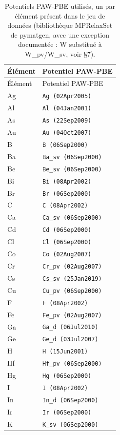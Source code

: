 \begin{longtable}{@{}l l@{}}
\caption{Potentiels PAW-PBE utilis\'es, un par \'el\'ement pr\'esent dans le jeu de donn\'ees (biblioth\`eque MPRelaxSet de pymatgen, avec une exception document\'ee : W substitu\'e \`a W\_pv/W\_sv, voir \S7).}\\
\toprule
\'El\'ement & Potentiel PAW-PBE \\
\midrule
\endfirsthead
\toprule
\'El\'ement & Potentiel PAW-PBE \\
\midrule
\endhead
\bottomrule
\endfoot
Ag & \texttt{Ag (02Apr2005)} \\
Al & \texttt{Al (04Jan2001)} \\
As & \texttt{As (22Sep2009)} \\
Au & \texttt{Au (04Oct2007)} \\
B & \texttt{B (06Sep2000)} \\
Ba & \texttt{Ba\_sv (06Sep2000)} \\
Be & \texttt{Be\_sv (06Sep2000)} \\
Bi & \texttt{Bi (08Apr2002)} \\
Br & \texttt{Br (06Sep2000)} \\
C & \texttt{C (08Apr2002)} \\
Ca & \texttt{Ca\_sv (06Sep2000)} \\
Cd & \texttt{Cd (06Sep2000)} \\
Cl & \texttt{Cl (06Sep2000)} \\
Co & \texttt{Co (02Aug2007)} \\
Cr & \texttt{Cr\_pv (02Aug2007)} \\
Cs & \texttt{Cs\_sv (25Jan2019)} \\
Cu & \texttt{Cu\_pv (06Sep2000)} \\
F & \texttt{F (08Apr2002)} \\
Fe & \texttt{Fe\_pv (02Aug2007)} \\
Ga & \texttt{Ga\_d (06Jul2010)} \\
Ge & \texttt{Ge\_d (03Jul2007)} \\
H & \texttt{H (15Jun2001)} \\
Hf & \texttt{Hf\_pv (06Sep2000)} \\
Hg & \texttt{Hg (06Sep2000)} \\
I & \texttt{I (08Apr2002)} \\
In & \texttt{In\_d (06Sep2000)} \\
Ir & \texttt{Ir (06Sep2000)} \\
K & \texttt{K\_sv (06Sep2000)} \\

\end{longtable}
